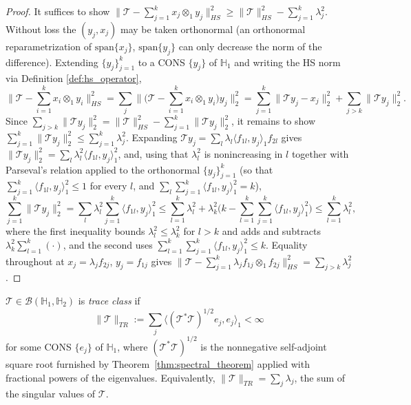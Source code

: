\begin{proof}
It suffices to show $\|\mathcal{T}-\sum_{j=1}^kx_j\otimes_1y_j\|_{HS}^2
\geq \|\mathcal{T}\|_{HS}^2 - \sum_{j=1}^k\lambda_j^2$. Without loss the
$(y_j,x_j)$ may be taken orthonormal (an orthonormal reparametrization of
$\mathrm{span}\{x_j\}$, $\mathrm{span}\{y_j\}$ can only decrease the norm
of the difference). Extending $\{y_j\}_{j=1}^k$ to a CONS $\{y_j\}$ of
$\mathbb{H}_1$ and writing the HS norm via Definition
\ref{def:hs_operator},
\[
\Big\|\mathcal{T}-\sum_{i=1}^kx_i\otimes_1y_i\Big\|_{HS}^2 =
\sum_j\Big\|\Big(\mathcal{T}-\sum_{i=1}^kx_i\otimes_1y_i\Big)y_j\Big\|_2^2
= \sum_{j=1}^k\|\mathcal{T}y_j-x_j\|_2^2 + \sum_{j>k}\|\mathcal{T}y_j\|_2^2.
\]
Since $\sum_{j>k}\|\mathcal{T}y_j\|_2^2 = \|\mathcal{T}\|_{HS}^2 -
\sum_{j=1}^k\|\mathcal{T}y_j\|_2^2$, it remains to show $\sum_{j=1}^k
\|\mathcal{T}y_j\|_2^2\leq\sum_{j=1}^k\lambda_j^2$. Expanding
$\mathcal{T}y_j=\sum_{l}\lambda_l\langle f_{1l},y_j\rangle_1f_{2l}$ gives
$\|\mathcal{T}y_j\|_2^2 = \sum_l\lambda_l^2\langle f_{1l},y_j\rangle_1^2$,
and, using that $\lambda_l^2$ is nonincreasing in $l$ together with
Parseval's relation applied to the orthonormal $\{y_j\}_{j=1}^k$ (so that
$\sum_{j=1}^k\langle f_{1l},y_j\rangle_1^2\leq 1$ for every $l$, and
$\sum_l\sum_{j=1}^k\langle f_{1l},y_j\rangle_1^2 = k$),
\[
\sum_{j=1}^k\|\mathcal{T}y_j\|_2^2 = \sum_{l}\lambda_l^2\sum_{j=1}^k
\langle f_{1l},y_j\rangle_1^2 \leq \sum_{l=1}^k\lambda_l^2 +
\lambda_k^2\Big(k - \sum_{l=1}^k\sum_{j=1}^k\langle f_{1l},y_j
\rangle_1^2\Big) \leq \sum_{l=1}^k\lambda_l^2,
\]
where the first inequality bounds $\lambda_l^2\leq\lambda_k^2$ for $l>k$ and
adds and subtracts $\lambda_k^2\sum_{l=1}^k(\cdot)$, and the second uses
$\sum_{l=1}^k\sum_{j=1}^k\langle f_{1l},y_j\rangle_1^2\leq k$. Equality
throughout at $x_j=\lambda_jf_{2j}$, $y_j=f_{1j}$ gives
$\|\mathcal{T}-\sum_{j=1}^k\lambda_jf_{1j}\otimes_1f_{2j}\|_{HS}^2 =
\sum_{j>k}\lambda_j^2$.
\end{proof}

\begin{definition}
\label{def:trace_class}
$\mathcal{T}\in\mathcal{B}(\mathbb{H}_1,\mathbb{H}_2)$ is \emph{trace
class} if 
\begin{equation*}
    \|\mathcal{T}\|_{TR} := \sum_j\langle(\mathcal{T}^*
\mathcal{T})^{1/2}e_j,e_j\rangle_1 <\infty
\end{equation*}
for some CONS $\{e_j\}$ of
$\mathbb{H}_1$, where $(\mathcal{T}^*\mathcal{T})^{1/2}$ is the nonnegative
self-adjoint square root furnished by Theorem~\ref{thm:spectral_theorem}
applied with fractional powers of the eigenvalues. Equivalently,
$\|\mathcal{T}\|_{TR}=\sum_j\lambda_j$, the sum of the singular values of
$\mathcal{T}$.
\end{definition}

